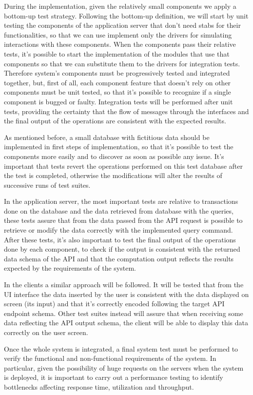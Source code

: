 During the implementation, given the relatively small components we apply a bottom-up test strategy. Following the bottom-up definition, we will start by unit testing the components of the application server that don't need stabs for their functionalities, so that we can use implement only the drivers for simulating interactions with these components. When the components pass their relative tests, it's possible to start the implementation of the modules that use that components so that we can substitute them to the drivers for integration tests. Therefore system's components must be progressively tested and integrated together, but, first of all, each component feature that doesn't rely on other components must be unit tested, so that it's possible to recognize if a single component is bugged or faulty. Integration tests will be performed after unit tests, providing the certainty that the flow of messages through the interfaces and the final output of the operations are consistent with the expected results.

As mentioned before, a small database with fictitious data should be implemented in first steps of implementation, so that it's possible to test the components more easily and to discover as soon as possible any issue. It's important that tests revert the operations performed on this test database after the test is completed, otherwise the modifications will alter the results of successive runs of test suites.

In the application server, the most important tests are relative to transactions done on the database and the data retrieved from database with the queries, these tests assure that from the data passed from the API request is possible to retrieve or modify the data correctly with the implemented query command. After these tests, it's also important to test the final output of the operations done by each component, to check if the output is consistent with the returned data schema of the API and that the computation output reflects the results expected by the requirements of the system.

In the clients a similar approach will be followed. It will be tested that from the UI interface the data inserted by the user is consistent with the data displayed on screen (its input) and that it's correctly encoded following the target API endpoint schema. Other test suites instead will assure that when receiving some data reflecting the API output schema, the client will be able to display this data correctly on the user screen. 

Once the whole system is integrated, a final system test must be performed to verify the functional and non-functional requirements of the system. In particular, given the possibility of huge requests on the servers when the system is deployed, it is important to carry out a performance testing to identify bottlenecks affecting response time, utilization and throughput.